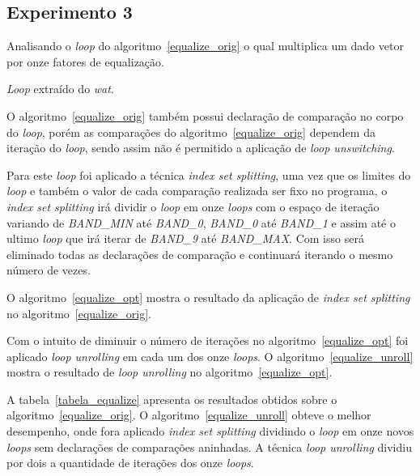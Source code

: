 \subsection{Experimento 3}

Analisando o \textit{loop} do algoritmo~\ref{equalize_orig} o qual multiplica um dado 
vetor por onze fatores de equalização.

\begin{algorithm}[H]
  \caption{\textit{Loop} extraído do \textit{wat}.}
\label{equalize_orig}

\end{algorithm}

O algoritmo~\ref{equalize_orig} também possui declaração de comparação no corpo do
\textit{loop}, porém as comparações do algoritmo~\ref{equalize_orig} dependem da
iteração do \textit{loop}, sendo assim não é permitido a aplicação de
\textit{loop unswitching}.

Para este \textit{loop} foi aplicado a técnica \textit{index set
splitting}, uma vez que os limites do \textit{loop} e também o valor de cada
comparação realizada ser fixo no programa, o \textit{index set splitting} irá
dividir o \textit{loop} em onze \textit{loops} com o espaço de iteração variando
de \textit{BAND\_MIN} até \textit{BAND\_0}, \textit{BAND\_0} até \textit{BAND\_1} e
assim até o ultimo \textit{loop} que irá iterar de \textit{BAND\_9} até
\textit{BAND\_MAX}. Com isso será eliminado todas as declarações de comparação e
continuará iterando o mesmo número de vezes.

O algoritmo~\ref{equalize_opt} mostra o resultado da aplicação de 
\textit{index set splitting} no algoritmo~\ref{equalize_orig}.

Com o intuito de diminuir o número de iterações no algoritmo~\ref{equalize_opt}
foi aplicado \textit{loop unrolling} em cada um dos onze \textit{loops}. 
O algoritmo~\ref{equalize_unroll} mostra o resultado de \textit{loop unrolling}
no algoritmo~\ref{equalize_opt}.

A tabela~\ref{tabela_equalize} apresenta os resultados obtidos sobre o
algoritmo~\ref{equalize_orig}. O algoritmo~\ref{equalize_unroll} obteve o melhor
desempenho, onde fora aplicado \textit{index set splitting} dividindo o
\textit{loop} em onze novos \textit{loops} sem declarações de comparações
aninhadas. A técnica \textit{loop unrolling} dividiu por dois a quantidade de
iterações dos onze \textit{loops}.

